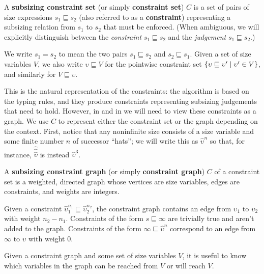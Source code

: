 \begin{definition}
A \textbf{subsizing constraint set} (or simply \textbf{constraint set}) $C$ is a set of pairs of size expressions $s_1 \sqsubseteq s_2$ (also referred to as a \textbf{constraint})
representing a subsizing relation from $s_1$ to $s_2$ that must be enforced.
(When ambiguous, we will explicitly distinguish between the \emph{constraint} $s_1 \sqsubseteq s_2$ and the \emph{judgement} $s_1 \sqsubseteq s_2$.)

We write $s_1 = s_2$ to mean the two pairs $s_1 \sqsubseteq s_2$ and $s_2 \sqsubseteq s_1$.
Given a set of size variables $V$, we also write $\upsilon \sqsubseteq V$ for the pointwise constraint set $\{\upsilon \sqsubseteq \upsilon' \mid \upsilon' \in V\}$,
and similarly for $V \sqsubseteq \upsilon$.
\end{definition}

This is the natural representation of the constraints:
the algorithm is based on the typing rules,
and they produce constraints representing subsizing judgements that need to hold.
However, in \RecCheck and in \solve we will need to view these constraints as a graph.
We use $C$ to represent either the constraint set or the graph depending on the context.
First, notice that any noninfinite size consists of a size variable and some finite number $n$ of successor ``hats'';
we will write this as $\hat{\upsilon}^n$ so that, for instance, $\hat{\hat{\hat{\upsilon}}}$ is instead $\hat{\upsilon}^3$.

\begin{definition}
A \textbf{subsizing constraint graph} (or simply \textbf{constraint graph}) $C$ of a constraint set is a weighted, directed graph whose vertices are size variables, edges are constraints, and weights are integers.

Given a constraint \mbox{$\hat{\upsilon}_1^{n_1} \sqsubseteq \hat{\upsilon}_2^{n_2}$},
the constraint graph contains an edge from $\upsilon_1$ to $\upsilon_2$ with weight $n_2 - n_1$.
Constraints of the form $s \sqsubseteq \infty$ are trivially true and aren't added to the graph.
Constraints of the form $\infty \sqsubseteq \hat{\upsilon}^n$ correspond to an edge from $\infty$ to $\upsilon$ with weight $0$.
\end{definition}

Given a constraint graph and some set of size variables $V$,
it is useful to know which variables in the graph can be reached from $V$ or will reach $V$.

